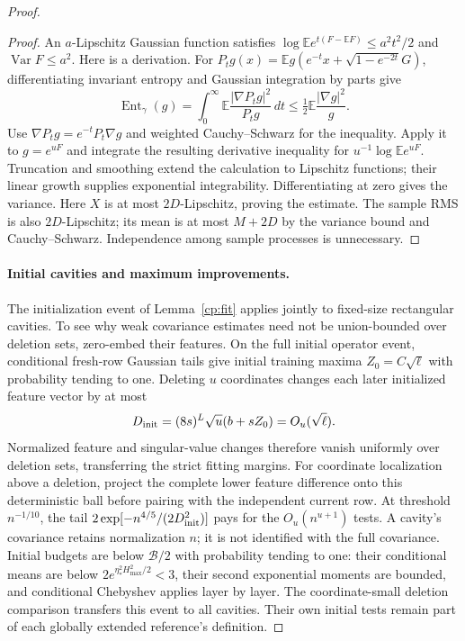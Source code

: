 \begin{proof}
\begin{proof}
An \(a\)-Lipschitz Gaussian function satisfies
\(\log\mathbb E e^{t(F-\mathbb EF)}\le a^2t^2/2\) and
\(\operatorname{Var}F\le a^2\).  Here is a derivation.
For \(P_tg(x)=\mathbb E g(e^{-t}x+\sqrt{1-e^{-2t}}G)\),
differentiating invariant entropy and Gaussian integration by parts give
\[
 \operatorname{Ent}_\gamma(g)
 =\int_0^\infty\mathbb E\frac{|\nabla P_tg|^2}{P_tg}\,dt
 \le\tfrac12\mathbb E\frac{|\nabla g|^2}{g}.
\]
Use \(\nabla P_tg=e^{-t}P_t\nabla g\) and weighted
Cauchy--Schwarz for the inequality.  Apply it to \(g=e^{uF}\) and
integrate the resulting derivative inequality for
\(u^{-1}\log\mathbb E e^{uF}\).  Truncation and smoothing extend
the calculation to Lipschitz functions; their linear growth supplies
exponential integrability.  Differentiating at zero gives the variance.
Here \(X\) is at most \(2D\)-Lipschitz, proving the estimate.
The sample RMS is also \(2D\)-Lipschitz; its mean is at most
\(M+2D\) by the variance bound and Cauchy--Schwarz.  Independence
among sample processes is unnecessary.
\end{proof}

\paragraph{Initial cavities and maximum improvements.}
The initialization event of Lemma~\ref{cp:fit} applies jointly to
fixed-size rectangular cavities.  To see why weak covariance estimates
need not be union-bounded over deletion sets, zero-embed their features.
On the full initial operator event, conditional fresh-row Gaussian
tails give initial training maxima \(Z_0=C\sqrt\ell\) with
probability tending to one.  Deleting \(u\) coordinates changes each
later initialized feature vector by at most
\[
 D_{\rm init}=(8s)^L\sqrt u(b+sZ_0)=O_u(\sqrt\ell).
\]
Normalized feature and singular-value changes therefore vanish
uniformly over deletion sets, transferring the strict fitting margins.
For coordinate localization above a deletion, project the complete
lower feature difference onto this deterministic ball before pairing
with the independent current row.  At threshold \(n^{-1/10}\),
the tail \(2\exp[-n^{4/5}/(2D_{\rm init}^2)]\) pays for the
\(O_u(n^{u+1})\) tests.  A cavity's covariance retains normalization
\(n\); it is not identified with the full covariance.
Initial budgets are below \(\mathcal B/2\) with probability tending
to one: their conditional means are below
\(2e^{\eta_*^2H_{\max}^2/2}<3\), their second exponential
moments are bounded, and conditional Chebyshev applies layer by layer.
The coordinate-small deletion comparison transfers this event to all
cavities.  Their own initial tests remain part of each globally
extended reference's definition.


\end{proof}
